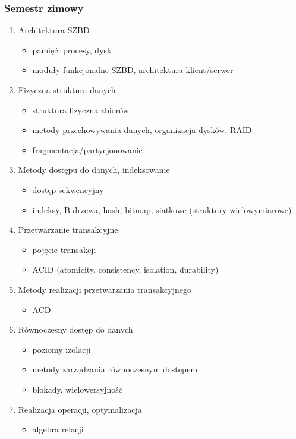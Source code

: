 \documentclass[12pt]{article}
\begin{document}
\subsubsection{Semestr zimowy}
\begin{enumerate}
\item Architektura SZBD
\begin{itemize}
\item pamięć, procesy, dysk
\item moduły funkcjonalne SZBD, architektura klient/serwer
\end{itemize}
\item Fizyczna struktura danych
\begin{itemize}
\item struktura fizyczna zbiorów
\item metody przechowywania danych, organizacja dysków, RAID
\item fragmentacja/partycjonowanie
\end{itemize}
\item Metody dostępu do danych, indeksowanie
\begin{itemize}
\item dostęp sekwencyjny
\item indeksy, B-drzewa, hash, bitmap, siatkowe (struktury wielowymiarowe)
\end{itemize}
\item Przetwarzanie transakcyjne
\begin{itemize}
\item pojęcie transakcji
\item ACID (atomicity, consistency, isolation, durability)
\end{itemize}
\item Metody realizacji przetwarzania transakcyjnego
\begin{itemize}
\item ACD
\end{itemize}
\item Równoczesny dostęp do danych
\begin{itemize}
\item poziomy izolacji
\item metody zarządzania równoczesnym dostępem
\item blokady, wielowersyjność
\end{itemize}
\item Realizacja operacji, optymalizacja
\begin{itemize}
\item algebra relacji

\end{itemize}
\end{enumerate}
\end{document}
